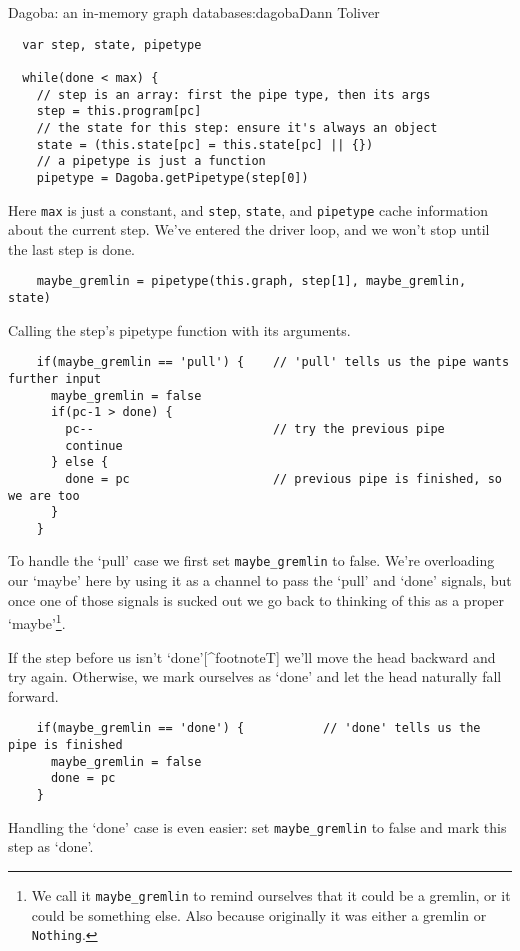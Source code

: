 \begin{aosachapter}{Dagoba: an in-memory graph database}{s:dagoba}{Dann Toliver}
\begin{verbatim}
  var step, state, pipetype

  while(done < max) {
    // step is an array: first the pipe type, then its args
    step = this.program[pc]                             
    // the state for this step: ensure it's always an object
    state = (this.state[pc] = this.state[pc] || {})     
    // a pipetype is just a function
    pipetype = Dagoba.getPipetype(step[0])              
\end{verbatim}

Here \texttt{max} is just a constant, and \texttt{step}, \texttt{state},
and \texttt{pipetype} cache information about the current step. We've
entered the driver loop, and we won't stop until the last step is done.

\begin{verbatim}
    maybe_gremlin = pipetype(this.graph, step[1], maybe_gremlin, state)
\end{verbatim}

Calling the step's pipetype function with its arguments.

\begin{verbatim}
    if(maybe_gremlin == 'pull') {    // 'pull' tells us the pipe wants further input
      maybe_gremlin = false
      if(pc-1 > done) {
        pc--                         // try the previous pipe
        continue
      } else {
        done = pc                    // previous pipe is finished, so we are too
      }
    }
\end{verbatim}

To handle the `pull' case we first set \texttt{maybe\_gremlin} to false.
We're overloading our `maybe' here by using it as a channel to pass the
`pull' and `done' signals, but once one of those signals is sucked out
we go back to thinking of this as a proper `maybe'\footnote{We call it
  \texttt{maybe\_gremlin} to remind ourselves that it could be a
  gremlin, or it could be something else. Also because originally it was
  either a gremlin or \texttt{Nothing}.}.

If the step before us isn't `done'{[}\^{}footnoteT{]} we'll move the
head backward and try again. Otherwise, we mark ourselves as `done' and
let the head naturally fall forward.

\begin{verbatim}
    if(maybe_gremlin == 'done') {           // 'done' tells us the pipe is finished
      maybe_gremlin = false
      done = pc
    }    
\end{verbatim}

Handling the `done' case is even easier: set \texttt{maybe\_gremlin} to
false and mark this step as `done'.


\end{aosachapter}
